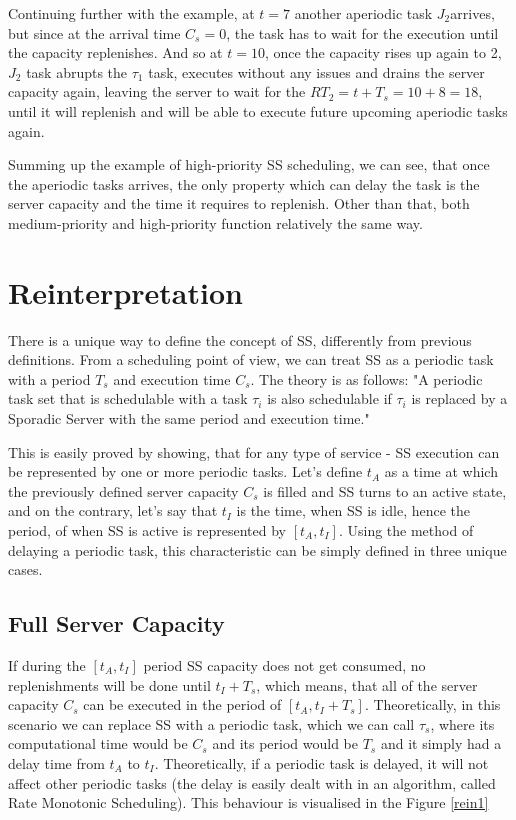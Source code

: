\documentclass[conference]{IEEEtran}
\begin{document}
Continuing further with the example, at $t = 7$ another aperiodic task $J_2$arrives, but since at the arrival time $C_s = 0$, the task has to wait for the execution until the capacity replenishes. And so at $t = 10$, once the capacity rises up again to 2, $J_2$ task abrupts the $\tau_1$ task, executes without any issues and drains the server capacity again, leaving the server to wait for the $RT_2 = t + T_s = 10 + 8 = 18$, until it will replenish and will be able to execute future upcoming aperiodic tasks again.

Summing up the example of high-priority SS scheduling, we can see, that once the aperiodic tasks arrives, the only property which can delay the task is the server capacity and the time it requires to replenish. Other than that, both medium-priority and high-priority function relatively the same way.

\section{Reinterpretation}

There is a unique way to define the concept of SS, differently from previous definitions. From a scheduling point of view, we can treat SS as a periodic task with a period $T_s$ and execution time $C_s$. The theory is as follows: "A periodic task set that is schedulable with a task $\tau_i$ is also schedulable if $\tau_i$ is replaced by a Sporadic Server with the same period and execution time." \cite{b1}

This is easily proved by showing, that for any type of service - SS execution can be represented by one or more periodic tasks. Let's define $t_A$ as a time at which the previously defined server capacity $C_s$ is filled and SS turns to an active state, and on the contrary, let's say that $t_I$ is the time, when SS is idle, hence the period, of when SS is active is represented by $[t_A,t_I ]$.  Using the method of delaying a periodic task, this characteristic can be simply defined in three unique cases.

\subsection{Full Server Capacity}

If during the $[t_A,t_I ]$ period SS capacity does not get consumed, no replenishments will be done until $t_I + T_s$, which means, that all of the server capacity $C_s$ can be executed in the period of  $[t_A,t_I  + T_s]$. Theoretically, in this scenario we can replace SS with a periodic task, which we can call $\tau_s$, where its computational time would be $C_s$ and its period would be $T_s$ and it simply had a delay time from $t_A$ to $t_I$. Theoretically, if a periodic task is delayed, it will not affect other periodic tasks (the delay is easily dealt with in an algorithm, called Rate Monotonic Scheduling). This behaviour is visualised in the Figure \ref{rein1}
\end{document}
